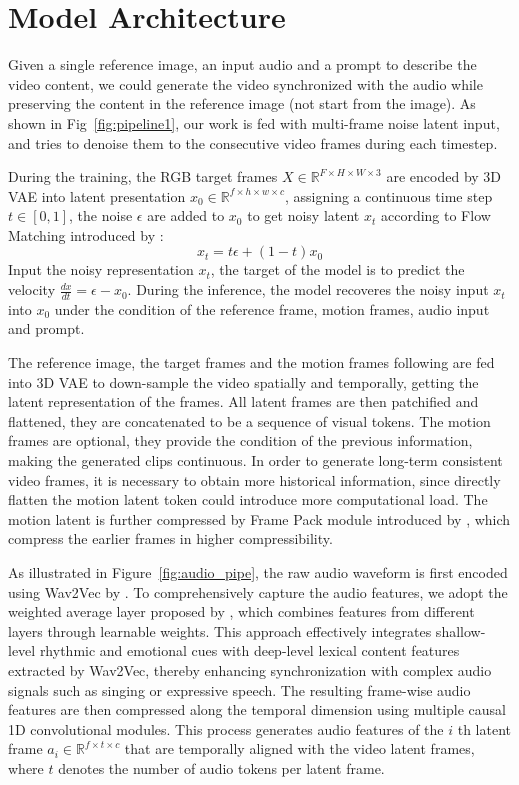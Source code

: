 \section{Model Architecture}

Given a single reference image, an input audio and a prompt to describe the video content, we could generate the video synchronized with the audio while preserving the content in the reference image (not start from the image).
As shown in Fig~\ref{fig:pipeline1}, our work is fed with multi-frame noise latent input, and tries to denoise them to the consecutive video frames during each timestep.

During the training, the RGB target frames $X\in\mathbb{R}^{F\times{H}\times{W}\times{3}}$ are encoded by 3D VAE into latent presentation $x_0\in\mathbb{R}^{f\times{h}\times{w}\times{c}}$, assigning a continuous time step $t\in[0,1]$, the noise $\epsilon$ are added to $x_0$ to get noisy latent $x_t$ according to Flow Matching introduced by \cite{lipman2023flowmatchinggenerativemodeling}:
$$ x_t=t\epsilon+(1-t)x_0$$
Input the noisy representation $x_t$, the target of the model is to predict the velocity $\frac{dx}{dt}=\epsilon-x_0$. During the inference, the model recoveres the noisy input $x_t$ into $x_0$ under the condition of the reference frame, motion frames, audio input and prompt.

The reference image, the target frames and the motion frames following \cite{tian2024emo} are fed into 3D VAE to down-sample the video spatially and temporally, getting the latent representation of the frames. All latent frames are then patchified and flattened, they are concatenated to be a sequence of visual tokens. The motion frames are optional, they provide the condition of the previous information, making the generated clips continuous. In order to generate long-term consistent video frames, it is necessary to obtain more historical information, since directly flatten the motion latent token could introduce more computational load. The motion latent is further compressed by Frame Pack module introduced by \cite{zhang2025framepack}, which compress the earlier frames in higher compressibility.


As illustrated in Figure~\ref{fig:audio_pipe}, the raw audio waveform is first encoded using Wav2Vec by \cite{wav2vec}. To comprehensively capture the audio features, we adopt the weighted average layer proposed by \cite{tian2024emo}, which combines features from different layers through learnable weights. This approach effectively integrates shallow-level rhythmic and emotional cues with deep-level lexical content features extracted by Wav2Vec, thereby enhancing synchronization with complex audio signals such as singing or expressive speech. The resulting frame-wise audio features are then compressed along the temporal dimension using multiple causal 1D convolutional modules. This process generates audio features of the $i$ th latent frame $a_i\in\mathbb{R}^{f\times{t}\times{c}}$ that are temporally aligned with the video latent frames, where $t$ denotes the number of audio tokens per latent frame.

